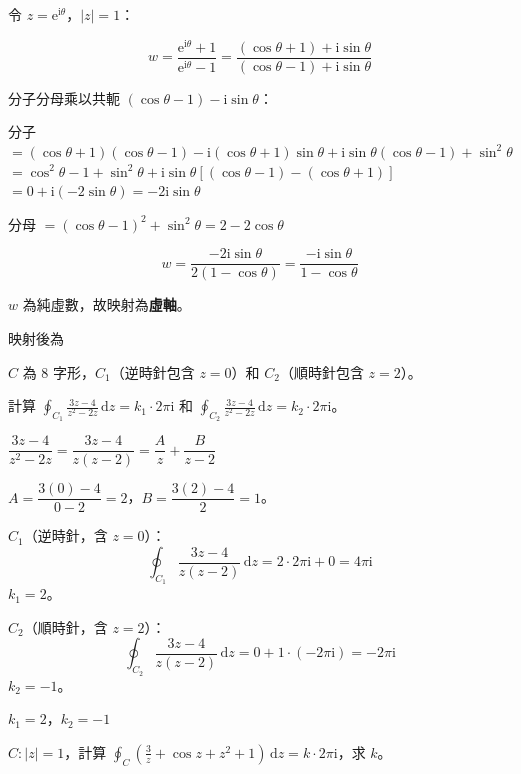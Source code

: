\documentclass[12pt,a4paper]{article}
\newcommand{\dd}{\,\mathrm{d}}
\newcommand{\ii}{\mathrm{i}}
\newcommand{\ee}{\mathrm{e}}
\begin{document}
\begin{solbox}[解]
令 $z=\ee^{\ii\theta}$，$|z|=1$：

$$w=\frac{\ee^{\ii\theta}+1}{\ee^{\ii\theta}-1}=\frac{(\cos\theta+1)+\ii\sin\theta}{(\cos\theta-1)+\ii\sin\theta}$$

分子分母乘以共軛 $(\cos\theta-1)-\ii\sin\theta$：

分子 $=(\cos\theta+1)(\cos\theta-1)-\ii(\cos\theta+1)\sin\theta+\ii\sin\theta(\cos\theta-1)+\sin^2\theta$
$=\cos^2\theta-1+\sin^2\theta+\ii\sin\theta[(\cos\theta-1)-(\cos\theta+1)]$
$=0+\ii(-2\sin\theta)=-2\ii\sin\theta$

分母 $=(\cos\theta-1)^2+\sin^2\theta=2-2\cos\theta$

$$w=\frac{-2\ii\sin\theta}{2(1-\cos\theta)}=\frac{-\ii\sin\theta}{1-\cos\theta}$$

$w$ 為純虛數，故映射為\textbf{虛軸}。
\end{solbox}

\begin{ansbox}
映射後為
\end{ansbox}

\begin{qbox}[第 12 題\,---\,8 字形圍道]
$C$ 為 8 字形，$C_1$（逆時針包含 $z=0$）和 $C_2$（順時針包含 $z=2$）。

計算 $\displaystyle\oint_{C_1}\frac{3z-4}{z^2-2z}\dd{z}=k_1\cdot 2\pi\ii$ 和 $\displaystyle\oint_{C_2}\frac{3z-4}{z^2-2z}\dd{z}=k_2\cdot 2\pi\ii$。
\end{qbox}

\begin{solbox}[解]
$\dfrac{3z-4}{z^2-2z}=\dfrac{3z-4}{z(z-2)}=\dfrac{A}{z}+\dfrac{B}{z-2}$

$A=\dfrac{3(0)-4}{0-2}=2$，$B=\dfrac{3(2)-4}{2}=1$。

\textbf{$C_1$}（逆時針，含 $z=0$）：
$$\oint_{C_1}\frac{3z-4}{z(z-2)}\dd{z}=2\cdot 2\pi\ii+0=4\pi\ii$$
$k_1=2$。

\textbf{$C_2$}（順時針，含 $z=2$）：
$$\oint_{C_2}\frac{3z-4}{z(z-2)}\dd{z}=0+1\cdot(-2\pi\ii)=-2\pi\ii$$
$k_2=-1$。
\end{solbox}

\begin{ansbox}
$k_1=\boxed{2}$，$k_2=\boxed{-1}$
\end{ansbox}

\begin{qbox}[第 13 題\,---\,混合積分]
$C:|z|=1$，計算 $\displaystyle\oint_C\left(\frac{3}{z}+\cos z+z^2+1\right)\dd{z}=k\cdot 2\pi\ii$，求 $k$。
\end{qbox}
\end{document}
